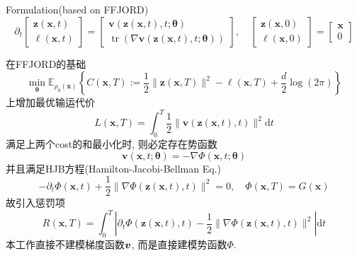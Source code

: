 \documentclass{article}
\begin{document}
\begin{flushleft}
    Formulation(based on FFJORD)
    \begin{equation}
        \partial_{t}\left[\begin{array}{c}
        \boldsymbol{z}(\boldsymbol{x}, t) \\
        \ell(\boldsymbol{x}, t)
        \end{array}\right]=\left[\begin{array}{c}
        \mathbf{v}(\boldsymbol{z}(\boldsymbol{x}, t), t ; \boldsymbol{\theta}) \\
        \operatorname{tr}(\nabla \mathbf{v}(\boldsymbol{z}(\boldsymbol{x}, t), t ; \boldsymbol{\theta}))
        \end{array}\right], \quad\left[\begin{array}{l}
        \boldsymbol{z}(\boldsymbol{x}, 0) \\
        \ell(\boldsymbol{x}, 0)
        \end{array}\right]=\left[\begin{array}{l}
        \boldsymbol{x} \\
        0
        \end{array}\right]
    \end{equation}

    在FFJORD的基础
    \begin{equation}
        \min _{\boldsymbol{\theta}} \mathbb{E}_{\rho_{0}(\boldsymbol{x})}\left\{C(\boldsymbol{x}, T):=\frac{1}{2}\|\boldsymbol{z}(\boldsymbol{x}, T)\|^{2}-\ell(\boldsymbol{x}, T)+\frac{d}{2} \log (2 \pi)\right\}
    \end{equation}
    上增加最优输运代价
    \begin{equation}
        L(\boldsymbol{x}, T)=\int_{0}^{T} \frac{1}{2}\|\mathbf{v}(\boldsymbol{z}(\boldsymbol{x}, t), t)\|^{2} \mathrm{d} t
    \end{equation}
    满足上两个cost的和最小化时, 则必定存在势函数
    \begin{equation}
        \mathbf{v}(\boldsymbol{x}, t ; \boldsymbol{\theta})=-\nabla \Phi(\boldsymbol{x}, t ; \boldsymbol{\theta})
    \end{equation}
    并且满足HJB方程(Hamilton-Jacobi-Bellman Eq.)
    \begin{equation}
        -\partial_{t} \Phi(\boldsymbol{x}, t)+\frac{1}{2}\|\nabla \Phi(\boldsymbol{z}(\boldsymbol{x}, t), t)\|^{2}=0, \quad \Phi(\boldsymbol{x}, T)=G(\boldsymbol{x})
    \end{equation}
    故引入惩罚项
    \begin{equation}
        R(\boldsymbol{x}, T)=\int_{0}^{T}\left|\partial_{t} \Phi(\boldsymbol{z}(\boldsymbol{x}, t), t)-\frac{1}{2}\|\nabla \Phi(\boldsymbol{z}(\boldsymbol{x}, t), t)\|^{2}\right| \mathrm{d} t
    \end{equation}
    本工作直接不建模梯度函数$\boldsymbol{v}$, 而是直接建模势函数$\Phi$.

\end{flushleft}
\end{document}
